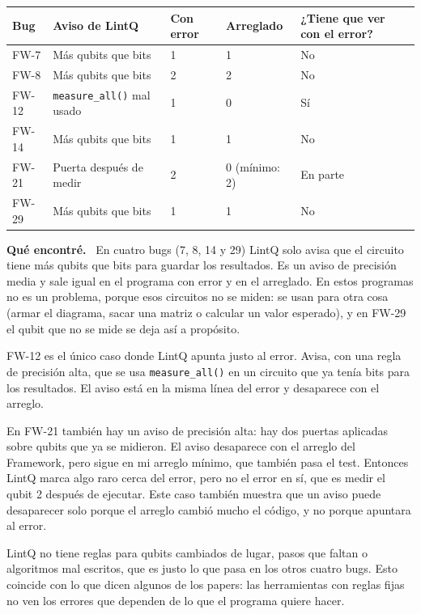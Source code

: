 \documentclass[11pt,a4paper]{article}
\newcommand{\parte}[1]{\par\textbf{#1.}\ }
\begin{document}
\begin{center}
\small
\begin{tabular}{lllll}
\toprule
Bug & Aviso de LintQ & Con error & Arreglado & ¿Tiene que ver con el error? \\
\midrule
FW-7 & Más qubits que bits & 1 & 1 & No \\
FW-8 & Más qubits que bits & 2 & 2 & No \\
FW-12 & \texttt{measure\_all()} mal usado & 1 & 0 & Sí \\
FW-14 & Más qubits que bits & 1 & 1 & No \\
FW-21 & Puerta después de medir & 2 & 0 (mínimo: 2) & En parte \\
FW-29 & Más qubits que bits & 1 & 1 & No \\
\bottomrule
\end{tabular}
\end{center}

\parte{Qué encontré}
En cuatro bugs (7, 8, 14 y 29) LintQ solo avisa que el circuito tiene más qubits que bits para guardar los resultados. Es un aviso de precisión media y sale igual en el programa con error y en el arreglado. En estos programas no es un problema, porque esos circuitos no se miden: se usan para otra cosa (armar el diagrama, sacar una matriz o calcular un valor esperado), y en FW-29 el qubit que no se mide se deja así a propósito.

FW-12 es el único caso donde LintQ apunta justo al error. Avisa, con una regla de precisión alta, que se usa \texttt{measure\_all()} en un circuito que ya tenía bits para los resultados. El aviso está en la misma línea del error y desaparece con el arreglo.

En FW-21 también hay un aviso de precisión alta: hay dos puertas aplicadas sobre qubits que ya se midieron. El aviso desaparece con el arreglo del Framework, pero sigue en mi arreglo mínimo, que también pasa el test. Entonces LintQ marca algo raro cerca del error, pero no el error en sí, que es medir el qubit 2 después de ejecutar. Este caso también muestra que un aviso puede desaparecer solo porque el arreglo cambió mucho el código, y no porque apuntara al error.

LintQ no tiene reglas para qubits cambiados de lugar, pasos que faltan o algoritmos mal escritos, que es justo lo que pasa en los otros cuatro bugs. Esto coincide con lo que dicen algunos de los papers: las herramientas con reglas fijas no ven los errores que dependen de lo que el programa quiere hacer.
\end{document}
